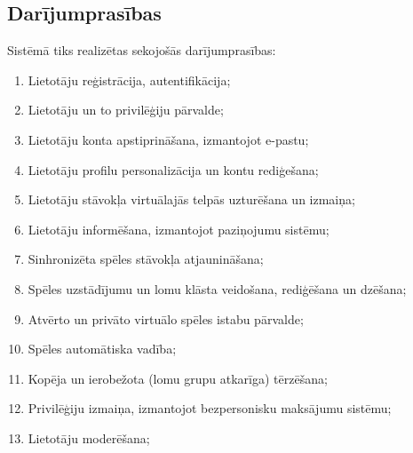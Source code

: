 \subsection{Darījumprasības}

Sistēmā tiks realizētas sekojošās darījumprasības:
\begin{enumerate}
	\item{Lietotāju reģistrācija, autentifikācija;}
	\item{Lietotāju un to privilēģiju pārvalde;}
	\item{Lietotāju konta apstiprināšana, izmantojot e-pastu;}
	\item{Lietotāju profilu personalizācija un kontu rediģešana;}
	\item{Lietotāju stāvokļa virtuālajās telpās uzturēšana un izmaiņa;}
	\item{Lietotāju informēšana, izmantojot paziņojumu sistēmu;}
	\item{Sinhronizēta spēles stāvokļa atjaunināšana;}
	\item{Spēles uzstādījumu un lomu klāsta veidošana, rediģēšana un dzēšana;}
	\item{Atvērto un privāto virtuālo spēles istabu pārvalde;}
	\item{Spēles automātiska vadība;}
	\item{Kopēja un ierobežota (lomu grupu atkarīga) tērzēšana;}
	\item{Privilēģiju izmaiņa, izmantojot bezpersonisku maksājumu sistēmu;}
	\item{Lietotāju moderēšana;}
\end{enumerate}
